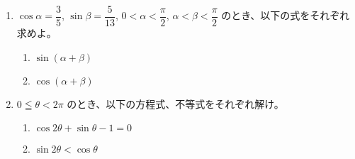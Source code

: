 \documentclass[8pt,dvipdfmx]{article}[b5paper]
\begin{document}
\begin{tcolorbox}[title=数学\textcircled{\scriptsize 3} 1-5 ABC]
  \begin{enumerate}[(1)]
 \item $\cos \alpha = \dfrac{3}{5}$, $\sin \beta = \dfrac{5}{13}$, $0 < \alpha < \dfrac{\pi}{2}$, $\alpha < \beta < \dfrac{\pi}{2}$ のとき、以下の式をそれぞれ求めよ。
    \begin{enumerate}
        \item $\sin(\alpha + \beta)$
        \item $\cos(\alpha + \beta)$
    \end{enumerate}
    \item $0 \leqq \theta < 2\pi$ のとき、以下の方程式、不等式をそれぞれ解け。
    \begin{enumerate}
        \item $\cos 2\theta + \sin \theta - 1 = 0$
        \item $\sin 2\theta < \cos \theta$
    \end{enumerate}
\end{enumerate}
\end{tcolorbox}
\end{document}
